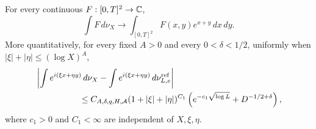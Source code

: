 \begin{theorem}
\label{thm:tpc51-row-equidistribution}
For every continuous \(F:[0,T]^2\to\mathbb C\),
\begin{equation}
 \int F\,d\nu_X
 \longrightarrow
 \int_{[0,T]^2}F(x,y)e^{x+y}\,dx\,dy.
 \label{eq:tpc51-weak-row-limit}
\end{equation}
More quantitatively, for every fixed \(A>0\) and every
\(0<\delta<1/2\), uniformly when
\(|\xi|+|\eta|\leq(\log X)^A\),
\begin{align}
 &\left|
 \int e^{i(\xi x+\eta y)}\,d\nu_X
 -\int e^{i(\xi x+\eta y)}\,d\nu_{L,e}^{\rm ref}
 \right|
 \notag\\
 &\hspace{18mm}\leq
 C_{A,\delta,q,H,\cA}
 (1+|\xi|+|\eta|)^{C_1}
 \left(e^{-c_1\sqrt{\log L}}+D^{-1/2+\delta}\right),
 \label{eq:tpc51-fourier-moment-error}
\end{align}
where \(c_1>0\) and \(C_1<\infty\) are independent of
\(X,\xi,\eta\).
\end{theorem}

